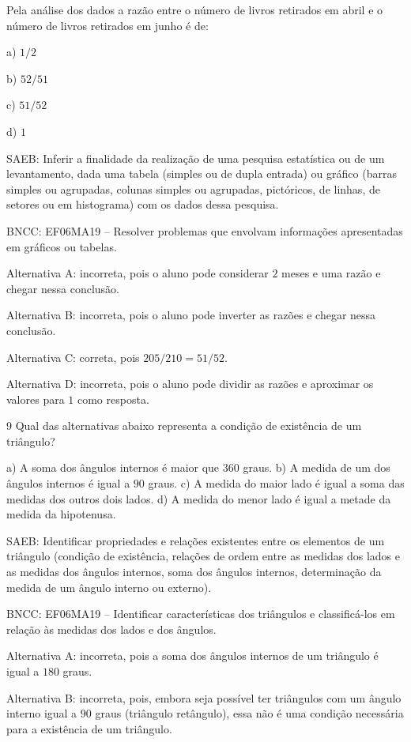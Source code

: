 Pela análise dos dados a razão entre o número de livros retirados em
abril e o número de livros retirados em junho é de:

a) $1/2$

b) $52/51$

c) $51/52$

d) $1$

SAEB: Inferir a finalidade da realização de uma pesquisa estatística ou
de um levantamento, dada uma tabela (simples ou de dupla entrada) ou
gráfico (barras simples ou agrupadas, colunas simples ou agrupadas,
pictóricos, de linhas, de setores ou em histograma) com os dados dessa
pesquisa.

BNCC: EF06MA19 -- Resolver problemas que envolvam informações
apresentadas em gráficos ou tabelas.~

Alternativa A: incorreta, pois o aluno pode considerar $2$ meses e uma
razão e chegar nessa conclusão.

Alternativa B: incorreta, pois o aluno pode inverter as razões e chegar
nessa conclusão.

Alternativa C: correta, pois $205/210 = 51/52$.

Alternativa D: incorreta, pois o aluno pode dividir as razões e
aproximar os valores para $1$ como resposta.

\num{9}  Qual das alternativas abaixo representa a condição de existência de
um triângulo?

a) A soma dos ângulos internos é maior que $360$ graus. b) A medida de um
dos ângulos internos é igual a $90$ graus. c) A medida do maior lado é
igual a soma das medidas dos outros dois lados. d) A medida do menor
lado é igual a metade da medida da hipotenusa.

SAEB: Identificar propriedades e relações existentes entre os elementos
de um triângulo (condição de existência, relações de ordem entre as
medidas dos lados e as medidas dos ângulos internos, soma dos ângulos
internos, determinação da medida de um ângulo interno ou externo).

BNCC: EF06MA19 -- Identificar características dos triângulos e
classificá-los em relação às medidas dos lados e dos ângulos.

Alternativa A: incorreta, pois a soma dos ângulos internos de um
triângulo é igual a $180$ graus.

Alternativa B: incorreta, pois, embora seja possível ter triângulos com
um ângulo interno igual a $90$ graus (triângulo retângulo), essa não é uma
condição necessária para a existência de um triângulo.


